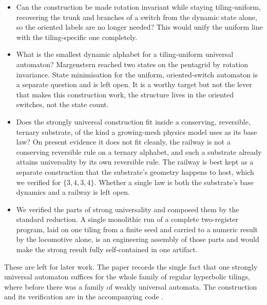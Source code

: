\begin{itemize}
  \item Can the construction be made rotation invariant while staying tiling-uniform, recovering the trunk and
  branches of a switch from the dynamic state alone, so the oriented labels are no longer needed? This would
  unify the uniform line with the tiling-specific one completely.
  \item What is the smallest dynamic alphabet for a tiling-uniform universal automaton? Margenstern reached two
  states on the pentagrid by rotation invariance. State minimisation for the uniform, oriented-switch automaton
  is a separate question and is left open. It is a worthy target but not the lever that makes this construction
  work, the structure lives in the oriented switches, not the state count.
  \item Does the strongly universal construction fit inside a conserving, reversible, ternary substrate, of the
  kind a growing-mesh physics model uses as its base law? On present evidence it does not fit cleanly, the
  railway is not a conserving reversible rule on a ternary alphabet, and such a substrate already attains
  universality by its own reversible rule. The railway is best kept as a separate construction that the
  substrate's geometry happens to host, which we verified for $\{3,4,3,4\}$. Whether a single law is both the
  substrate's base dynamics and a railway is left open.
  \item We verified the parts of strong universality and composed them by the standard reduction. A single
  monolithic run of a complete two-register program, laid on one tiling from a finite seed and carried to a
  numeric result by the locomotive alone, is an engineering assembly of those parts and would make the strong
  result fully self-contained in one artifact.
\end{itemize}

These are left for later work. The paper records the single fact that one strongly universal automaton suffices
for the whole family of regular hyperbolic tilings, where before there was a family of weakly universal
automata. The construction and its verification are in the accompanying code \cite{pollard2026vibe}.
